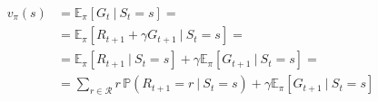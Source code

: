 \documentclass[preview]{standalone}
\begin{document}
	\begin{equation}
	\begin{split}
	v_\pi(s) &= \mathbb{E}_{\pi}\left[G_t\:|\:S_t=s\right]= \\
	&= \mathbb{E}_{\pi}\left[R_{t+1} +\gamma G_{t+1}\:|\:S_t=s\right]= \\
	&= \mathbb{E}_{\pi}\left[R_{t+1}\:|\:S_t=s\right] +\gamma \mathbb{E}_{\pi}\left[G_{t+1}\:|\:S_t=s\right]= \\
	&= \sum_{r\in\mathcal{R}}r\,\mathbb{P}\left( R_{t+1}=r\:|\: S_{t}=s \right) +\gamma \mathbb{E}_{\pi}\left[G_{t+1}\:|\:S_t=s\right]
	\end{split}
	\end{equation}              
\end{document}
